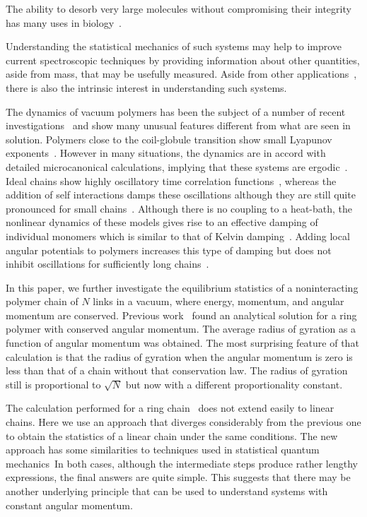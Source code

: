 \documentclass[11pt]{ucthesis}
\begin{document}
The ability to desorb very large molecules without compromising their
integrity has many uses in biology~\cite{Hillenkamp}. 

Understanding
the statistical mechanics of such systems may help to improve current
spectroscopic techniques by providing information about other quantities,
aside from mass, that may be usefully measured. Aside from other
applications~\cite{DeutschPolyVac}, there is also the intrinsic interest
in understanding such systems. 

The dynamics of vacuum polymers has been the subject of a number of recent
investigations~\cite{Kleinert,mossa,DeutschPolyVac,DeutschCerf,Taylor,DeutschExactVac}  and show
many unusual features different from what are seen in solution. Polymers close to the coil-globule
transition show small Lyapunov exponents~\cite{mossa}. However in many situations,
the dynamics are in accord with detailed microcanonical calculations,
implying that these systems are ergodic~\cite{Taylor}. Ideal chains show
highly oscillatory time correlation functions~\cite{DeutschPolyVac}, whereas
the addition of self interactions damps these oscillations although they
are still quite pronounced for small chains~\cite{Taylor}.  Although there
is no coupling to a heat-bath, the nonlinear dynamics of these models
gives rise to an effective damping of individual monomers which is similar
to that of Kelvin damping~\cite{SethnaBookKelvinFriction}.  Adding local angular 
potentials to polymers increases this type of damping but does not
inhibit oscillations for sufficiently long chains~\cite{DeutschCerf}.

In this paper, we further investigate the equilibrium statistics
of a noninteracting polymer chain of $N$ links in a vacuum, where
energy, momentum, and angular momentum are conserved. Previous
work~\cite{DeutschExactVac} found an analytical solution for a ring
polymer with conserved angular momentum.  The average radius of gyration
as a function of angular momentum was obtained. The most
surprising feature of that calculation is that the radius of gyration when
the angular momentum is zero is less than that of a chain without that
conservation law. The radius of gyration still is proportional
to $\sqrt{N}$ but now with a different proportionality constant.

The calculation performed for a ring chain~\cite{DeutschExactVac} does not
extend easily to linear chains.  Here we use an approach that diverges considerably
from the previous one to obtain the statistics of a linear chain under
the same conditions. The new approach has some similarities to techniques used in statistical quantum mechanics~\cite{KleinertBook}In both cases, although the intermediate steps
produce rather lengthy expressions, the final answers are quite simple.
This suggests that there may be another underlying principle that can be
used to understand systems with constant angular momentum.
\end{document}

